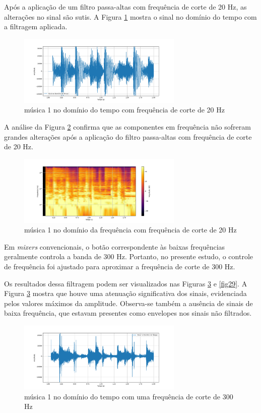 Após a aplicação de um filtro passa-altas com frequência de corte de 20 Hz, as alterações no sinal são sutis. A Figura \ref{fig24} mostra o sinal no domínio do tempo com a filtragem aplicada.

\begin{figure}[h]
    \centering
    \includegraphics[width=0.7\textwidth]{figuras/fig24.png}
    \caption{música 1 no domínio do tempo com frequência de corte de 20 Hz}
    \label{fig24}
\end{figure}

A análise da Figura \ref{fig25} confirma que as componentes em frequência não sofreram grandes alterações após a aplicação do filtro passa-altas com frequência de corte de 20 Hz.

\begin{figure}[h]
    \centering
    \includegraphics[width=0.7\textwidth]{figuras/fig25.png}
    \caption{música 1 no domínio da frequência com frequência de corte de 20 Hz}
    \label{fig25}
\end{figure}


Em \textit{mixers} convencionais, o botão correspondente às baixas frequências geralmente controla a banda de 300 Hz. Portanto, no presente estudo, o controle de frequência foi ajustado para aproximar a frequência de corte de 300 Hz.

Os resultados dessa filtragem podem ser visualizados nas Figuras \ref{fig28} e \ref{fig29}. A Figura \ref{fig28} mostra que houve uma atenuação significativa dos sinais, evidenciada pelos valores máximos da amplitude. Observa-se também a ausência de sinais de baixa frequência, que estavam presentes como envelopes nos sinais não filtrados.

\begin{figure}[h]
    \centering
    \includegraphics[width=0.7\textwidth]{figuras/fig28.png}
    \caption{música 1 no domínio do tempo com uma frequência de corte de 300 Hz}
    \label{fig28}
\end{figure}

